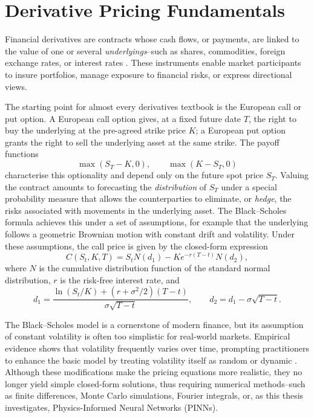 \documentclass[12pt]{report} %
\theoremstyle{plain}           %
\theoremstyle{definition}      %
\theoremstyle{remark}          %
\begin{document}
\section{Derivative Pricing Fundamentals}\label{sec:derivatives_overview}

Financial derivatives are contracts whose cash flows, or payments, are linked to the value of one
or several \emph{underlyings}--such as shares, commodities, foreign exchange rates, or interest
rates \cite{alma99148840908702021,Wilmott2010PaulWO}. These instruments enable market participants
to insure portfolios, manage exposure to financial risks, or express directional views.

The starting point for almost every derivatives textbook is the European call or put option. A
European call option gives, at a fixed future date \(T\), the right to buy the underlying at the
pre-agreed strike price \(K\); a European put option grants the right to sell the underlying asset
at the same strike. The payoff functions
\[
\max(S_T-K,0),\qquad \max(K-S_T,0)
\]
characterise this optionality and depend only on the future spot price \(S_T\). Valuing the
contract amounts to forecasting the \emph{distribution} of \(S_T\) under a special probability
measure that allows the counterparties to eliminate, or \emph{hedge}, the risks associated with
movements in the underlying asset. The Black--Scholes formula achieves this under a set of
assumptions, for example that the underlying follows a geometric Brownian motion with constant
drift and volatility. Under these assumptions, the call price is given by the closed-form
expression
\[
C(S_t,K,T)=S_t N(d_1)-K e^{-r(T-t)} N(d_2),
\]
where \(N\) is the cumulative distribution function of the standard normal distribution, \(r\) is
the risk-free interest rate, and
\[
d_1=\frac{\ln(S_t/K)+(r+\sigma^2/2)(T-t)}{\sigma\sqrt{T-t}},\qquad
d_2=d_1-\sigma\sqrt{T-t}.
\]

The Black--Scholes model is a cornerstone of modern finance, but its assumption of constant
volatility is often too simplistic for real-world markets. Empirical evidence shows that volatility
frequently varies over time, prompting practitioners to enhance the basic model by treating
volatility itself as random or dynamic \cite{hestonmodel}. Although these modifications make the
pricing equations more realistic, they no longer yield simple closed-form solutions, thus
requiring numerical methods--such as finite differences, Monte Carlo simulations, Fourier
integrals, or, as this thesis investigates, Physics-Informed Neural Networks (PINNs).
\end{document}
